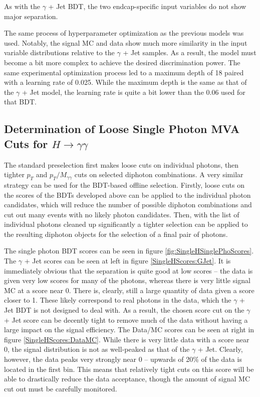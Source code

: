 \documentclass[12pt]{ucsddissertation}
\begin{document}
As with the $\gamma$ + Jet BDT, the two endcap-specific input variables do not show major separation. 

The same process of hyperparameter optimization as the previous models was used. Notably, the signal MC and data show much more similarity in the input variable distributions relative to the $\gamma$ + Jet samples. As a result, the model must become a bit more complex to achieve the desired discrimination power. The same experimental optimization process led to a maximum depth of 18 paired with a learning rate of 0.025. While the maximum depth is the same as that of the $\gamma$ + Jet model, the learning rate is quite a bit lower than the 0.06 used for that BDT.
 
\subsection{Determination of Loose Single Photon MVA Cuts for $H \rightarrow \gamma \gamma$} \label{sec:SingleHSinglePhoCuts}
The standard preselection first makes loose cuts on individual photons, then tighter $p_T$ and $p_T/M_{\gamma \gamma}$ cuts on selected diphoton combinations. A very similar strategy can be used for the BDT-based offline selection. Firstly, loose cuts on the scores of the BDTs developed above can be applied to the individual photon candidates, which will reduce the number of possible diphoton combinations and cut out many events with no likely photon candidates. Then, with the list of individual photons cleaned up significantly a tighter selection can be applied to the resulting diphoton objects for the selection of a final pair of photons. 

The single photon BDT scores can be seen in figure \ref{fig:SingleHSinglePhoScores}. The $\gamma$ + Jet scores can be seen at left in figure \ref{SingleHScores:GJet}. It is immediately obvious that the separation is quite good at low scores -- the data is given very low scores for many of the photons, whereas there is very little signal MC at a score near 0. There is, clearly, still a large quantity of data given a score closer to 1. These likely correspond to real photons in the data, which the $\gamma$ + Jet BDT is not designed to deal with. As a result, the chosen score cut on the $\gamma$ + Jet score can be decently tight to remove much of the data without having a large impact on the signal efficiency. The Data/MC scores can be seen at right in figure \ref{SingleHScores:DataMC}. While there is very little data with a score near 0, the signal distribution is not as well-peaked as that of the $\gamma$ + Jet. Clearly, however, the data peaks very strongly near 0 -- upwards of 20\% of the data is located in the first bin. This means that relatively tight cuts on this score will be able to drastically reduce the data acceptance, though the amount of signal MC cut out must be carefully monitored.
\end{document}
